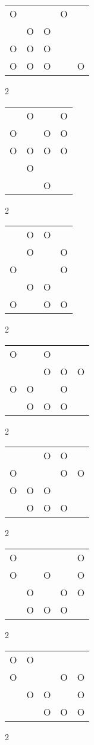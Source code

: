 \begin{tabular}{|m{0.2cm}m{0.2cm}m{0.2cm}m{0.2cm}m{0.2cm}|}\hline
O& & &O& \\
 &O&O& & \\
O&O&O& & \\
O&O&O& &O\\
\hline\end{tabular}2
\begin{tabular}{|m{0.2cm}m{0.2cm}m{0.2cm}m{0.2cm}|}\hline
 &O& &O\\
O& &O&O\\
O&O&O&O\\
 &O& & \\
 & &O& \\
\hline\end{tabular}2
\begin{tabular}{|m{0.2cm}m{0.2cm}m{0.2cm}m{0.2cm}|}\hline
 &O&O& \\
 &O& &O\\
O& & &O\\
 &O&O& \\
O& &O&O\\
\hline\end{tabular}2
\begin{tabular}{|m{0.2cm}m{0.2cm}m{0.2cm}m{0.2cm}m{0.2cm}|}\hline
O& &O& & \\
 & &O&O&O\\
O&O& &O& \\
 &O&O&O& \\
\hline\end{tabular}2
\begin{tabular}{|m{0.2cm}m{0.2cm}m{0.2cm}m{0.2cm}m{0.2cm}|}\hline
 & &O&O& \\
O& & &O&O\\
O&O&O& & \\
 &O&O&O& \\
\hline\end{tabular}2
\begin{tabular}{|m{0.2cm}m{0.2cm}m{0.2cm}m{0.2cm}m{0.2cm}|}\hline
O& & & &O\\
O& &O& &O\\
 &O& &O&O\\
 &O&O&O& \\
\hline\end{tabular}2
\begin{tabular}{|m{0.2cm}m{0.2cm}m{0.2cm}m{0.2cm}m{0.2cm}|}\hline
O&O& & & \\
O& & &O&O\\
 &O&O& &O\\
 & &O&O&O\\
\hline\end{tabular}2
